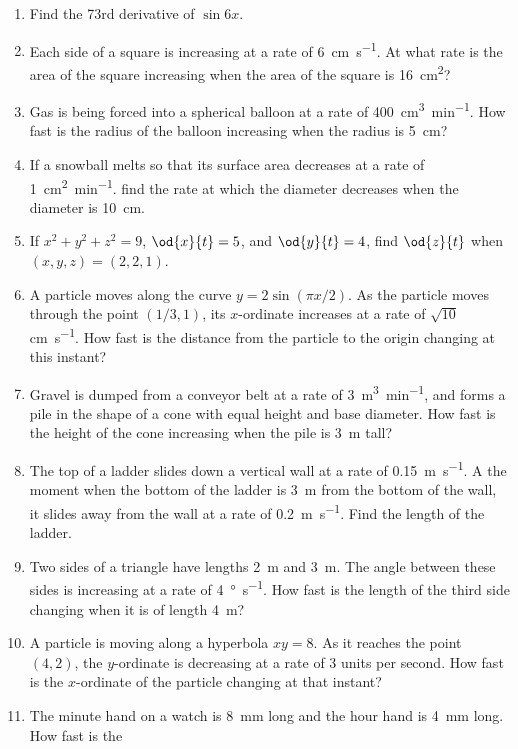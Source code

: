 \begin{enumerate}
  \item Find the 73rd derivative of $ \sin 6x $.
  \item Each side of a square is increasing at a rate of \SI{6}{\centi\metre\per\second}. At what rate is the
        area of the square increasing when the area of the square is \SI{16}{\centi\metre\squared}?
  \item Gas is being forced into a spherical balloon at a rate of \SI{400}{\centi\metre\cubed\per\minute}. How fast
        is the radius of the balloon increasing when the radius is \SI{5}{\centi\metre}?
  \item If a snowball melts so that its surface area decreases at a rate of \SI{1}{\centi\metre\squared\per\minute}.
        find the rate at which the diameter decreases when the diameter is \SI{10}{\centi\metre}.
  \item If $ x^2 + y^2 + z^2 = 9 $, $ \od{x}{t} = 5 $, and $ \od{y}{t} = 4 $, find $ \od{z}{t} $ when $ (x,y,z) = (2,2,1) $.
  \item A particle moves along the curve $ y = 2\sin(\pi x/2) $. As the particle moves through the point $ (1/3, 1) $,
        its $ x$-ordinate increases at a rate of $ \sqrt{10} $ \si{\centi\metre\per\second}. How fast is the distance
        from the particle to the origin changing at this instant?
  \item Gravel is dumped from a conveyor belt at a rate of \SI{3}{\metre\cubed\per\minute}, and forms a pile in the shape
        of a cone with equal height and base diameter. How fast is the height of the cone increasing when the pile is \SI{3}{\metre}
        tall?
  \item The top of a ladder slides down a vertical wall at a rate of \SI{0.15}{\metre\per\second}. A the moment when the bottom
        of the ladder is \SI{3}{\metre} from the bottom of the wall, it slides away from the wall at a rate of \SI{0.2}{\metre\per\second}.
        Find the length of the ladder.
  \item Two sides of a triangle have lengths \SI{2}{\metre} and \SI{3}{\metre}. The angle between these sides is increasing
        at a rate of \SI{4}{\degree\per\second}. How fast is the length of the third side changing when it is of length \SI{4}{\metre}?
  \item A particle is moving along a hyperbola $ xy = 8 $. As it reaches the point $ (4, 2) $, the $ y$-ordinate is decreasing
        at a rate of 3 units per second. How fast is the $ x$-ordinate of the particle changing at that instant?
  \item The minute hand on a watch is \SI{8}{\milli\metre} long and the hour hand is \SI{4}{\milli\metre} long. How fast is the

\end{enumerate}
